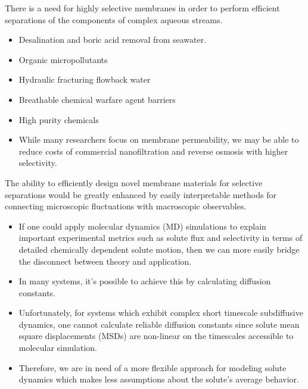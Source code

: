 \documentclass[journal=jpcbfk,manuscript=article]{achemso}
\begin{document}
  There is a need for highly selective membranes in order to perform efficient 
  separations of the components of complex aqueous streams.
  \begin{itemize}
    \item Desalination and boric acid removal from seawater.
    \item Organic micropollutants
    \item Hydraulic fracturing flowback water
    \item Breathable chemical warfare agent barriers
    \item High purity chemicals
    \item While many researchers focus on membrane permeability, we may be 
    able to reduce costs of commercial nanofiltration and reverse osmosis with
    higher selectivity.~\cite{werber_materials_2016}
  \end{itemize}
  
  The ability to efficiently design novel membrane materials for selective separations
  would be greatly enhanced by easily interpretable methods for connecting microscopic
  fluctuations with macroscopic observables.
  \begin{itemize}
  	\item If one could apply molecular dynamics (MD) simulations to explain important
  	experimental metrics such as solute flux and selectivity in terms of detailed 
  	chemically dependent solute motion, then we can more easily bridge the disconnect
  	between theory and application.
  	\item In many systems, it's possible to achieve this by calculating diffusion 
  	constants.%
  	\item Unfortunately, for systems which exhibit complex short timescale 
  	subdiffusive dynamics, one cannot calculate reliable diffusion 
  	constants since solute mean square displacements (MSDs) are non-linear 
    on the timescales accessible to molecular simulation.
  	\item Therefore, we are in need of a more flexible approach for modeling solute 
  	dynamics which makes less assumptions about the solute's average behavior.
  \end{itemize}
  
\end{document}
